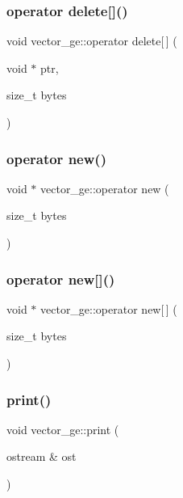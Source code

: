 \subsubsection{\texorpdfstring{operator delete[]()}{operator delete[]()}}
{\footnotesize\ttfamily void vector\+\_\+ge\+::operator delete\mbox{[}$\,$\mbox{]} (\begin{DoxyParamCaption}\item[{void $\ast$}]{ptr,  }\item[{size\+\_\+t}]{bytes }\end{DoxyParamCaption})}

\mbox{\label{classvector__ge_a3ac4408bbd6f0a54b9243dcc8d755a3f}} 
\subsubsection{\texorpdfstring{operator new()}{operator new()}}
{\footnotesize\ttfamily void $\ast$ vector\+\_\+ge\+::operator new (\begin{DoxyParamCaption}\item[{size\+\_\+t}]{bytes }\end{DoxyParamCaption})}

\mbox{\label{classvector__ge_adc2ed4b444b4519629605205d545c9c6}} 
\subsubsection{\texorpdfstring{operator new[]()}{operator new[]()}}
{\footnotesize\ttfamily void $\ast$ vector\+\_\+ge\+::operator new\mbox{[}$\,$\mbox{]} (\begin{DoxyParamCaption}\item[{size\+\_\+t}]{bytes }\end{DoxyParamCaption})}

\mbox{\label{classvector__ge_a0d260cce035c20b32d7989c50670aa8a}} 
\subsubsection{\texorpdfstring{print()}{print()}\hspace{0.1cm}{\footnotesize\ttfamily [1/2]}}
{\footnotesize\ttfamily void vector\+\_\+ge\+::print (\begin{DoxyParamCaption}\item[{ostream \&}]{ost }\end{DoxyParamCaption})}

